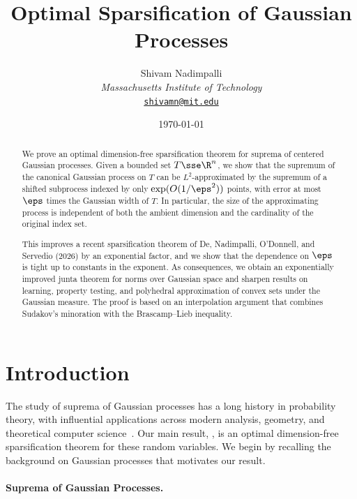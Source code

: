 \documentclass[11pt]{article}
\title{Optimal Sparsification of Gaussian Processes}
\author{%
	Shivam Nadimpalli \\%
	\emph{Massachusetts Institute of Technology} \\%
	\href{mailto:shivamn@mit.edu}{\texttt{shivamn@mit.edu}}
}
\date{\today}
\begin{document}

\maketitle 

\begin{abstract}
We prove an optimal dimension-free sparsification theorem for suprema of centered Gaussian processes. 
Given a bounded set $T\sse\R^n$, we show that the supremum of the canonical Gaussian process on $T$ can be $L^2$-approximated by the supremum of a shifted subprocess indexed by only $\exp(O(1/\eps^2))$ points, with error at most $\eps$ times the Gaussian width of $T$. 
In particular, the size of the approximating process is independent of both the ambient dimension and the cardinality of the original index set. 

This improves a recent sparsification theorem of De, Nadimpalli, O'Donnell, and Servedio (2026) by an exponential factor, and we show that the dependence on $\eps$ is tight up to constants in the exponent. 
As consequences, we obtain an exponentially improved junta theorem for norms over Gaussian space and sharpen results on learning, property testing, and polyhedral approximation of convex sets under the Gaussian measure. The proof is based on an interpolation argument that combines Sudakov's minoration with the Brascamp--Lieb inequality. 
\end{abstract}

\newpage 
\setcounter{page}{1}

\section{Introduction}
\label{sec:intro}

The study of suprema of Gaussian processes has a long history in probability theory, with influential applications across modern analysis, geometry, and theoretical computer science~\cite{rvh-notes,Nelson16,vershynin2018high,talagrand2022upper}. 
Our main result, , is an optimal dimension-free sparsification theorem for these random variables. 
We begin by recalling the background on Gaussian processes that motivates our result. 

\paragraph{Suprema of Gaussian Processes.} 
\end{document}
